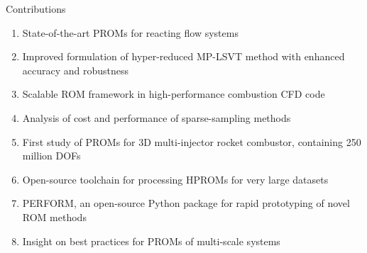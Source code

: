 \documentclass[]{beamer}
\begin{document}

\begin{frame}{Contributions}
    \begin{enumerate}
        \item State-of-the-art PROMs for reacting flow systems
        \item Improved formulation of hyper-reduced MP-LSVT method with enhanced accuracy and robustness
        \item Scalable ROM framework in high-performance combustion CFD code
        \item Analysis of cost and performance of sparse-sampling methods
        \item First study of PROMs for 3D multi-injector rocket combustor, containing 250 million DOFs
        \item Open-source toolchain for processing HPROMs for very large datasets
        \item PERFORM, an open-source Python package for rapid prototyping of novel ROM methods
        \item Insight on best practices for PROMs of multi-scale systems
    \end{enumerate}
\end{frame}
\end{document}
